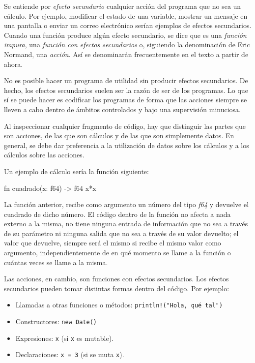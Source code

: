Se entiende por \textit{efecto secundario} cualquier acción del programa que no sea un cálculo. Por ejemplo, modificar el estado de una variable, mostrar un mensaje en una pantalla o enviar un correo electrónico serían ejemplos de efectos secundarios. Cuando una función produce algún efecto secundario, se dice que es una \textit{función impura}, una \textit{función con efectos secundarios} o, siguiendo la denominación de Eric Normand, una \textit{acción}. Así se denominarán frecuentemente en el texto a partir de ahora.

No es posible hacer un programa de utilidad sin producir efectos secundarios. De hecho, los efectos secundarios suelen ser la razón de ser de los programas. Lo que sí se puede hacer es codificar los programas de forma que las acciones siempre se lleven a cabo dentro de ámbitos controlados y bajo una supervisión minuciosa.

Al inspeccionar cualquier fragmento de código, hay que distinguir las partes que son acciones, de las que son cálculos y de las que son simplemente datos. En general, se debe dar preferencia a la utilización de datos sobre los cálculos y a los cálculos sobre las acciones.

\pagebreak

Un ejemplo de cálculo sería la función siguiente:

\vspace{0.7em}
\begin{Codigo}
   fn cuadrado(x: f64) -> f64 {
      x*x
   }
\end{Codigo}

La función anterior, recibe como argumento un número del tipo \textit{f64} y devuelve el cuadrado de dicho número. El código dentro de la función no afecta a nada externo a la misma, no tiene ninguna entrada de información que no sea a través de su parámetro ni ninguna salida que no sea a través de su valor devuelto; el valor que devuelve, siempre será el mismo si recibe el mismo valor como argumento, independientemente de en qué momento se llame a la función o cuántas veces se llame a la misma. 

Las acciones, en cambio, son funciones con efectos secundarios. Los efectos secundarios pueden tomar distintas formas dentro del código. Por ejemplo:
\begin{itemize}
   \item Llamadas a otras funciones o métodos: \texttt{println!("Hola, qué tal")}   
   \item Constructores: \texttt{new Date()}
   \item Expresiones: \texttt{x} (si \texttt{x} es mutable).   
   \item Declaraciones: \texttt{x = 3} (si se muta \texttt{x}).
\end{itemize}


